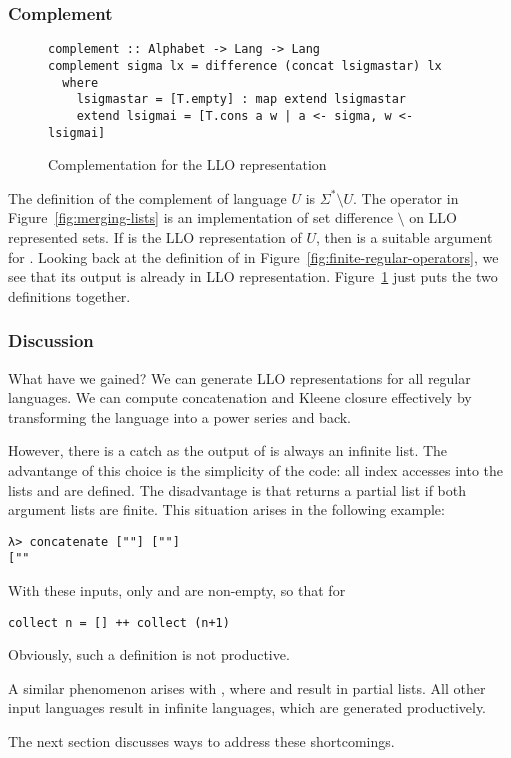 \subsubsection{Complement}
\begin{figure}[tp]
\begin{lstlisting}
complement :: Alphabet -> Lang -> Lang
complement sigma lx = difference (concat lsigmastar) lx
  where
    lsigmastar = [T.empty] : map extend lsigmastar
    extend lsigmai = [T.cons a w | a <- sigma, w <- lsigmai]
\end{lstlisting}
  \caption{Complementation for the LLO representation}
  \label{fig:llo-complement}
\end{figure}
The definition of the complement of language $U$ is $\Sigma^*\setminus
U$.  The  operator in Figure~\ref{fig:merging-lists}
is an implementation of set difference $\setminus$ on LLO represented
sets.  If  is the LLO 
representation of $U$, then  is a suitable argument for
.  Looking back at the definition of
 in Figure~\ref{fig:finite-regular-operators}, we see
that its output is already in LLO
representation. Figure~\ref{fig:llo-complement} just puts the two
definitions together.

\subsubsection{Discussion}\label{sec:motivation-discussion}
What have we gained? We can generate LLO
representations for all regular languages. We can compute
concatenation and Kleene closure effectively by transforming the
language into a power series and back.

However, there is a catch as the output of  is always
an infinite list. The advantange of this choice is the simplicity of
the code: all index accesses into the lists  and
 are defined. The disadvantage is
that  returns a partial list if both argument lists
are finite.
This situation arises in the following example:
\begin{verbatim}
λ> concatenate [""] [""]
[""
\end{verbatim}
With these inputs, only  and  are
non-empty, so that for
\begin{lstlisting}[numbers=false]
collect n = [] ++ collect (n+1)
\end{lstlisting}
Obviously, such a definition is not productive.

A similar phenomenon arises with , where  and
 result in partial lists. All other input languages
result in infinite languages, which are generated productively.

The next section discusses ways to address these shortcomings.

